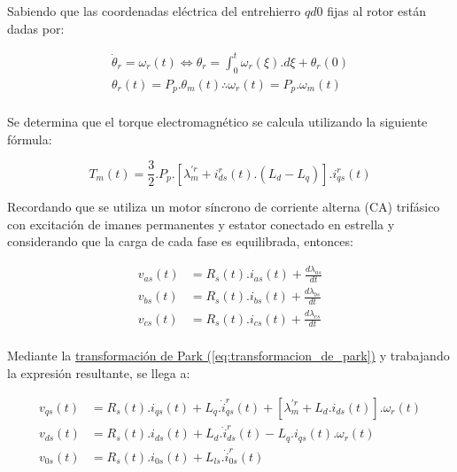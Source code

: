 \documentclass{article}
\begin{document}
    Sabiendo que las coordenadas eléctrica del entrehierro $qd0$ fijas al rotor están dadas por:

    \begin{equation}\label{eq.coordenadas_fijas_al_rotor}
        \begin{aligned}
            \dot{\theta}_r = \omega_r(t) \Leftrightarrow  \theta_r = \int_0^t \omega_r(\xi).d\xi + \theta_r(0)\\
            \theta_r(t) = P_p.\theta_m(t) \therefore \omega_r(t) = P_p.\omega_m(t)\\
        \end{aligned}
    \end{equation}

    Se determina que el torque electromagnético se calcula utilizando la siguiente fórmula:

    \begin{equation}\label{eq.torque_electromagnetico}
        T_{m}(t) = \frac{3}{2}.P_{p}.[\lambda_{m}^{\prime r}+i_{ds}^r(t).(L_{d}-L_{q})].i_{qs}^r(t)
    \end{equation}

    Recordando que 
    se utiliza un motor síncrono de corriente alterna (CA) trifásico con excitación de imanes 
    permanentes y estator conectado en estrella y considerando que la carga de cada fase es equilibrada, entonces:

    \begin{equation}\label{eq.tensiones_abc}
        \begin{aligned}
            v_{as}(t) &= R_{s}(t).i_{as}(t) + \frac{d\lambda_{as}}{dt}\\
            v_{bs}(t) &= R_{s}(t).i_{bs}(t) + \frac{d\lambda_{bs}}{dt}\\
            v_{cs}(t) &= R_{s}(t).i_{cs}(t) + \frac{d\lambda_{cs}}{dt}\\
        \end{aligned}
    \end{equation}

    Mediante la
    \hyperref[eq:transformacion_de_park]{transformación de Park (\ref*{eq:transformacion_de_park})}
    y trabajando la expresión resultante, se llega a:

    \begin{equation}\label{eq.tensiones_qd0}
        \begin{aligned}
            v_{qs}(t) &= R_{s}(t).i_{qs}(t) + L_{q}.\dot{i}_{qs}^r(t) + [\lambda_{m}^{\prime r} + L_{d}.i_{ds}(t)].\omega_{r}(t)\\
            v_{ds}(t) &= R_{s}(t).i_{ds}(t) + L_{d}.\dot{i}_{ds}^r(t)  - L_{q}.i_{qs}(t).\omega_{r}(t)\\
            v_{0s}(t) &= R_{s}(t).i_{0s}(t) + L_{ls}.\dot{i}_{0s}^r(t)
        \end{aligned}
    \end{equation}
\end{document}
